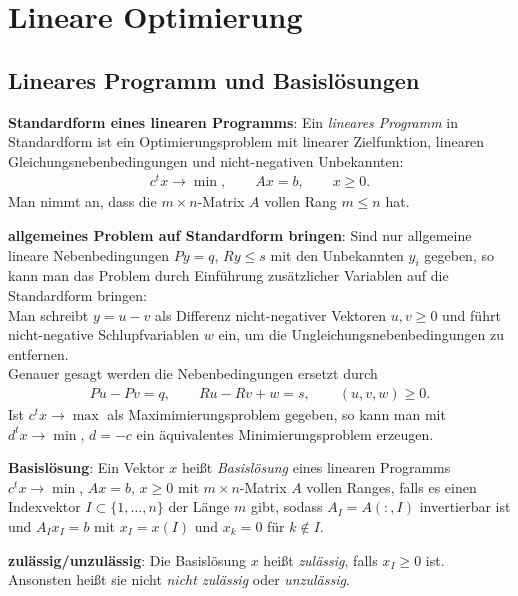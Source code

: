 \chapter{%
    Lineare Optimierung%
}

\section{%
    Lineares Programm und Basislösungen%
}

\textbf{Standardform eines linearen Programms}:
Ein \emph{lineares Programm} in Standardform ist ein Optimierungsproblem
mit linearer Zielfunktion,
linearen Gleichungsnebenbedingungen und nicht-negativen Unbekannten:
\begin{align*}
    c^t x \rightarrow \min, \qquad
    Ax = b, \qquad
    x \ge 0.
\end{align*}
Man nimmt an, dass die $m \times n$-Matrix $A$ vollen Rang $m \le n$ hat.

\textbf{allgemeines Problem auf Standardform bringen}:
Sind nur allgemeine lineare Nebenbedingungen
$Py = q$, $Ry \le s$ mit den Unbekannten $y_i$ gegeben, so kann man das Problem
durch Einführung zusätzlicher Variablen auf die Standardform bringen: \\
Man schreibt $y = u - v$ als Differenz nicht-negativer Vektoren $u, v \ge 0$
und führt nicht-negative Schlupfvariablen $w$ ein, um
die Ungleichungsnebenbedingungen zu entfernen. \\
Genauer gesagt werden die Nebenbedingungen ersetzt durch
\begin{align*}
    Pu - Pv = q, \qquad
    Ru - Rv + w = s, \qquad
    (u, v, w) \ge 0.
\end{align*}
Ist $c^t x \rightarrow \max$ als Maximimierungsproblem gegeben, so kann man
mit $d^t x \rightarrow \min$, $d = -c$ ein äquivalentes Minimierungsproblem
erzeugen.

\linie

\textbf{Basislösung}:
Ein Vektor $x$ heißt \emph{Basislösung} eines linearen Programms
$c^t x \rightarrow \min$, $Ax = b$, $x \ge 0$ mit $m \times n$-Matrix $A$
vollen Ranges, falls es einen Indexvektor
$I \subset \{1, \dotsc, n\}$ der Länge $m$ gibt, sodass
$A_I = A(:, I)$ invertierbar ist und $A_I x_I = b$ mit $x_I = x(I)$
und $x_k = 0$ für $k \notin I$.

\textbf{zulässig/unzulässig}:
Die Basislösung $x$ heißt \emph{zulässig}, falls $x_I \ge 0$ ist.
Ansonsten heißt sie nicht \emph{nicht zulässig} oder \emph{unzulässig}.

